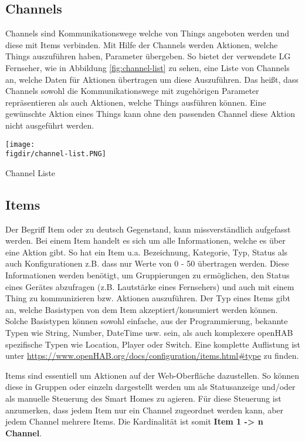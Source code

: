 \subsection{Channels} \label{sec:channels}
Channels sind Kommunikationswege welche von Things angeboten werden und diese mit Items verbinden. Mit Hilfe der Channels werden Aktionen, welche Things auszuführen haben, Parameter übergeben. So bietet der verwendete LG Fernseher, wie in Abbildung \ref{fig:channel-list} zu sehen, eine Liste von Channels an, welche Daten für Aktionen übertragen um diese Auszuführen. Das heißt, dass Channels sowohl die Kommunikationswege mit zugehörigen Parameter repräsentieren als auch Aktionen, welche Things ausführen können. Eine gewünschte Aktion eines Things kann ohne den passenden Channel diese Aktion nicht ausgeführt werden.

\smallskip
{
	\centering
	\captionsetup{type=figure}
	\texttt{[image: \\figdir/channel-list.PNG]}
	\caption{Channel Liste\label{fig:channel-list}}
}

\subsection{Items}
Der Begriff Item oder zu deutsch Gegenstand, kann missverständlich aufgefasst werden. Bei einem Item handelt es sich um alle Informationen, welche es über eine Aktion gibt. So hat ein Item u.a. Bezeichnung, Kategorie, Typ, Status als auch Konfigurationen z.B. dass nur Werte von 0 - 50 übertragen werden. Diese Informationen werden benötigt, um Gruppierungen zu ermöglichen, den Status eines Gerätes abzufragen (z.B. Lautstärke eines Fernsehers) und auch mit einem Thing zu kommunizieren bzw. Aktionen auszuführen. Der Typ eines Items gibt an, welche Basistypen von dem Item akzeptiert/konsumiert werden können. Solche Basistypen können sowohl einfache, aus der Programmierung, bekannte Typen wie String, Number, DateTime usw. sein, als auch komplexere openHAB spezifische Typen wie Location, Player oder Switch. Eine komplette Auflistung ist unter \url{https://www.openHAB.org/docs/configuration/items.html#type} zu finden.

Items sind essentiell um Aktionen auf der Web-Oberfläche dazustellen. So können diese in Gruppen oder einzeln dargestellt werden um als Statusanzeige und/oder als manuelle Steuerung des Smart Homes zu agieren. Für diese Steuerung ist anzumerken, dass jedem Item nur ein Channel zugeordnet werden kann, aber jedem Channel mehrere Items. Die Kardinalität ist somit \textbf{Item 1 -> n Channel}.

